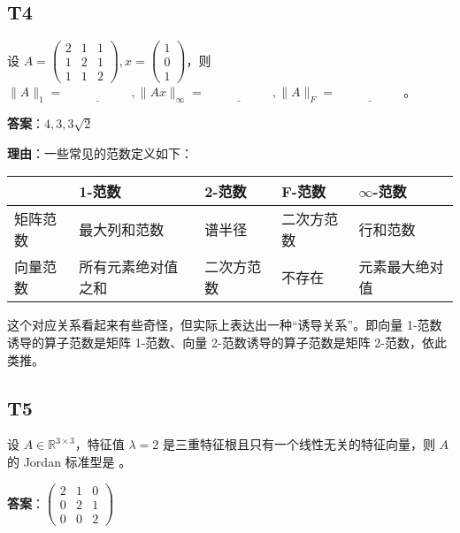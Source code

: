 \documentclass{article}
\begin{document}
\subsection{T4}

\par 设 $A=\begin{pmatrix}
	2 & 1 & 1\\
	1 & 2 & 1\\
	1 & 1 & 2
\end{pmatrix}, x=\begin{pmatrix}
	1\\0\\1
\end{pmatrix}$，则 $\|A\|_1=\underline{\phantom{empty\_space}}, \|Ax\|_{\infty}=\underline{\phantom{empty\_space}}, \|A\|_F=\underline{\phantom{empty\_space}}$。

\par \textbf{答案}：$4, 3, 3\sqrt 2$

\par \textbf{理由}：一些常见的范数定义如下：

\begin{tabularx}{\linewidth}{|X|X|X|X|X|} 
	\hline
	 & 1-范数 & 2-范数 & F-范数 & $\infty$-范数 \\ 
	\hline
	矩阵范数 & 最大列和范数 & 谱半径 & 二次方范数 & 行和范数 \\ 
	\hline
	向量范数 & 所有元素绝对值之和 & 二次方范数 & 不存在 & 元素最大绝对值 \\ 
	\hline
\end{tabularx}

\par 这个对应关系看起来有些奇怪，但实际上表达出一种“诱导关系”。即向量 1-范数 诱导的算子范数是矩阵 1-范数、向量 2-范数诱导的算子范数是矩阵 2-范数，依此类推。

\subsection{T5}

\par 设 $A\in \mathbb R^{3\times 3}$，特征值 $\lambda=2$ 是三重特征根且只有一个线性无关的特征向量，则 $A$ 的 Jordan 标准型是 \underline{\phantom{empty\_space}}。

\par\textbf{答案}：$\begin{pmatrix}
	2 & 1 & 0\\
	0 & 2 & 1\\
	0 & 0 & 2
\end{pmatrix}$
\end{document}
